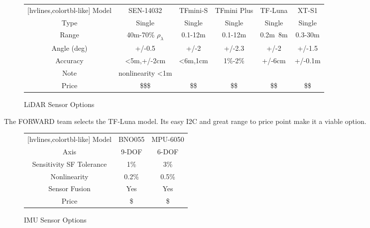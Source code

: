 \begin{figure}[H]
	\centering
	\setlength{\tabcolsep}{5pt} %
	\renewcommand{\arraystretch}{1.5} %
	\begin{NiceTabular}{cccccc}[hvlines,colortbl-like]
		\CodeBefore
		\Body
		Model       & SEN-14032               & TFmini-S & TFmini Plus & TF-Luna & XT-S1   \\
		Type        & Single 				  & Single   & Single      & Single  & Single  \\
		Range       & 40m-70\% $\rho_\lambda$ & 0.1-12m  & 0.1-12m     & 0.2m~8m & 0.3-30m \\
		Angle (deg) & +/-0.5                  & +/-2     & +/-2.3      & +/-2    & +/-1.5  \\
		Accuracy    & <5m,+/-2cm              & <6m,1cm  & 1\%-2\%     & +/-6cm  & +/-0.1m \\
		Note        & nonlinearity <1m        &  &  &  & \\
		Price       & \$\$\$                  & \$\$     & \$\$        & \$\$    & \$\$
	\end{NiceTabular}
	\caption{\label{fig:compareLiDAR}LiDAR Sensor Options}
\end{figure}

\noindent The FORWARD team selects the TF-Luna model. Its easy I2C and great range to price point make it a viable option.\\

\begin{figure}[H]
	\centering
	\setlength{\tabcolsep}{5pt} %
	\renewcommand{\arraystretch}{1.5} %
	\begin{NiceTabular}{ccc}[hvlines,colortbl-like]
		\CodeBefore
		\Body
		Model         & BNO055 & MPU-6050 \\
		Axis          & 9-DOF   & 6-DOF    \\
		Sensitivity SF Tolerance & 1\% & 3\%  \\
		Nonlinearity  & 0.2\%   & 0.5\%    \\
		Sensor Fusion & Yes     & Yes      \\
		Price         & \$      & \$       \\
	\end{NiceTabular}
	\caption{\label{fig:compareIMU}IMU Sensor Options}
\end{figure}

